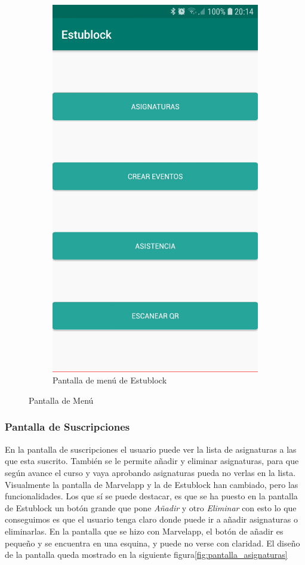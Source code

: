 \begin{figure}[hbt]
\begin{subfigure}[b]{0.4\linewidth}
        \includegraphics[width=0.7\linewidth]{figs/Desarrollo/Interfaz/estublock_menu}
        \caption[Estublock Menú]{Pantalla de menú de Estublock}
	\end{subfigure} 
	\caption[Pantalla de Menú]{Pantalla de Menú}
	\label{fig:pantalla_menu}
\end{figure}

\subsubsection{Pantalla de Suscripciones}

En la pantalla de suscripciones el usuario puede ver la lista de asignaturas a las que esta suscrito. También se le permite añadir y eliminar asignaturas, para que según avance el curso y vaya aprobando asignaturas pueda no verlas en la lista. Visualmente la pantalla de Marvelapp y la de Estublock han cambiado, pero las funcionalidades. Los que sí se puede destacar, es que se ha puesto en la pantalla de Estublock un botón grande que pone \textit{Añadir} y otro \textit{Eliminar} con esto lo que conseguimos es que el usuario tenga claro donde puede ir a añadir asignaturas o eliminarlas. En la pantalla que se hizo con Marvelapp, el botón de añadir es pequeño y se encuentra en una esquina, y puede no verse con claridad. El diseño de la pantalla queda mostrado en la siguiente figura\ref{fig:pantalla_asignaturas}

